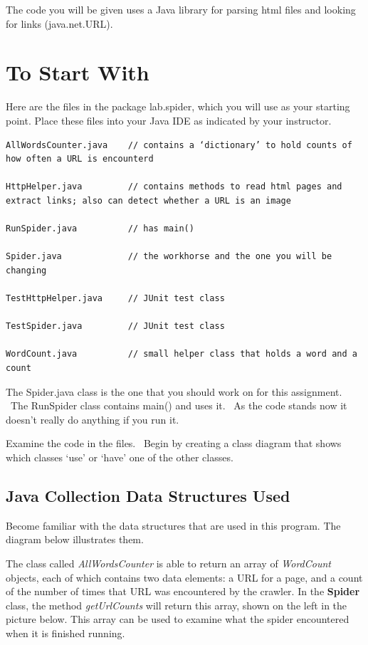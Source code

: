\documentclass[letterpaper,10pt,openany,oneside]{sphinxmanual}
\begin{document}
The code you will be given
uses a Java library for parsing html files and looking for links
(java.net.URL).


\section{To Start With}
\label{TheSpiderLabonecrawler/TheSpiderLabonecrawler:to-start-with}
Here are the files in the package lab.spider, which you will use as
your starting point. Place these files into your Java IDE as indicated
by your instructor.

\begin{Verbatim}[commandchars=\\\{\}]
AllWordsCounter.java    // contains a ‘dictionary’ to hold counts of how often a URL is encounterd

HttpHelper.java         // contains methods to read html pages and extract links; also can detect whether a URL is an image

RunSpider.java          // has main()

Spider.java             // the workhorse and the one you will be changing

TestHttpHelper.java     // JUnit test class

TestSpider.java         // JUnit test class

WordCount.java          // small helper class that holds a word and a count
\end{Verbatim}

The Spider.java class is the one that you should work on for this
assignment.  The RunSpider class contains main() and uses it.  As
the code stands now it doesn’t really do anything if you run it.

Examine the code in the files.  Begin by creating a class diagram
that shows which classes ‘use’ or ‘have’ one of the other classes.


\subsection{Java Collection Data Structures Used}
\label{TheSpiderLabonecrawler/TheSpiderLabonecrawler:java-collection-data-structures-used}
Become familiar with the data structures that are used in this program.
The diagram below illustrates them.

The class called \emph{AllWordsCounter}
is able to return an array of \emph{WordCount} objects, each of which contains two data elements:
a URL for a page, and a count of the number of times that URL was encountered by the crawler.
In the \textbf{Spider} class, the method \emph{getUrlCounts} will return this array, shown on the left in
the picture below.  This array can be used to examine what the spider encountered when it is
finished running.
\end{document}
